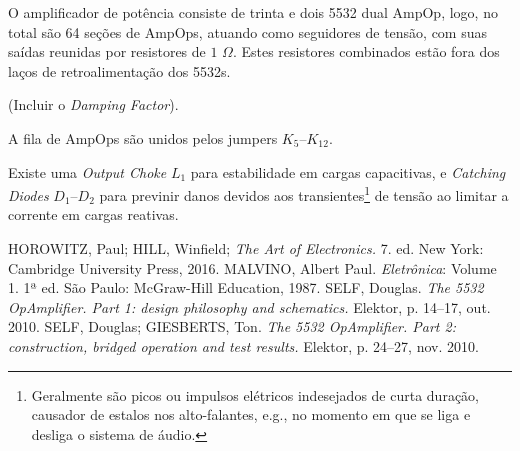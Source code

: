 \documentclass[12pt, a4paper, leqno, twoside]{book}
\def\ohm{\,\Omega}
\def\ampop{AmpOp}
\begin{document}
  O amplificador de pot\^encia consiste de trinta e dois 5532 dual \ampop, logo, no total s\~ao 64 se\c c\~oes de \ampop{s}, atuando como seguidores de tens\~ao, com suas sa\'idas reunidas por resistores de $1\,\ohm$. Estes resistores combinados est\~ao fora dos la\c cos de retroalimenta\c c\~ao dos 5532s.

  (Incluir o {\it Damping Factor}).

  A fila de \ampop{s} s\~ao unidos pelos jumpers $K_5$--$K_{12}$.

  Existe uma {\it Output Choke} $L_1$ para estabilidade em cargas capacitivas, e {\it Catching Diodes} $D_1$--$D_2$ para previnir danos devidos aos transientes\footnote{Geralmente s\~ao picos ou impulsos el\'etricos indesejados de curta dura\c c\~ao, causador de estalos nos alto-falantes, e.g., no momento em que se liga e desliga o sistema de \'audio.} de tens\~ao ao limitar a corrente em cargas reativas. 
  \begin{thebibliography}{}
    HOROWITZ, Paul; HILL, Winfield; {\it The Art of Electronics.} 7. ed. New York: Cambridge University Press, 2016.
    MALVINO, Albert Paul. {\it Eletr\^onica\/}: Volume 1. 1ª ed. S\~ao Paulo: McGraw-Hill Education, 1987.
    SELF, Douglas. {\it The 5532 OpAmplifier. Part 1: design philosophy and schematics.} Elektor, p. 14--17, out. 2010.
    SELF, Douglas; GIESBERTS, Ton. {\it The 5532 OpAmplifier. Part 2: construction, bridged operation and test results.} Elektor, p. 24--27, nov. 2010.
  \end{thebibliography}
\end{document}
